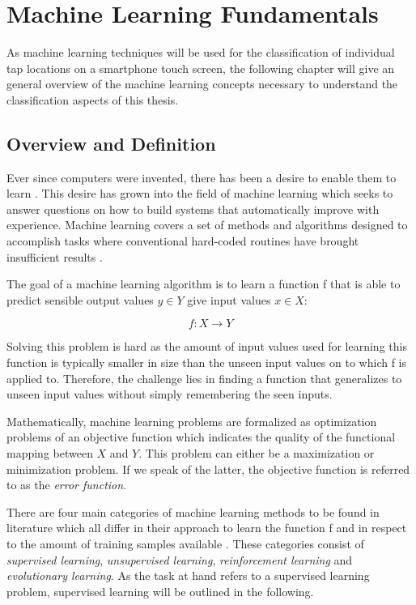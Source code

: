 \chapter{Machine Learning Fundamentals}
As machine learning techniques will be used for the classification of individual tap locations on a smartphone touch screen, the following chapter will give an general overview of the machine learning concepts necessary to understand the classification aspects of this thesis.

\section{Overview and Definition}

Ever since computers were invented, there has been a desire to enable them to learn \cite{samuel2000some}. This desire has grown into the field of machine learning which seeks to answer questions on how to build systems that automatically improve with experience. Machine learning covers a set of methods and algorithms designed to accomplish tasks where conventional hard-coded routines have brought insufficient results \cite{mitchell2006discipline}.

The goal of a machine learning algorithm is to learn a function f that is able to predict sensible output values $y \in Y$ give input values $x \in X$:

\begin{equation}
  f: X \rightarrow Y
\end{equation}

Solving this problem is hard as the amount of input values used for learning this function is typically smaller in size than the unseen input values on to which f is applied to. Therefore, the challenge lies in finding a function that generalizes to unseen input values without simply remembering the seen inputs.

Mathematically, machine learning problems are formalized as optimization problems of an objective function which indicates the quality of the functional mapping between $X$ and $Y$. This problem can either be a maximization or minimization problem. If we speak of the latter, the objective function is referred to as the \textit{error function}.

There are four main categories of machine learning methods to be found in literature which all differ in their approach to learn the function f and in respect to the amount of training samples available \cite{Duda:2000:PC:954544, Marsland:2009:MLA:1571643}. These categories consist of \textit{supervised learning}, \textit{unsupervised learning}, \textit{reinforcement learning} and \textit{evolutionary learning}. As the task at hand refers to a supervised learning problem, supervised learning will be outlined in the following.

